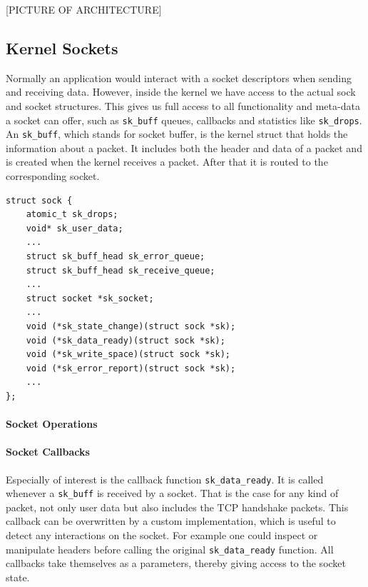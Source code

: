 \documentclass[a4paper,english, 11pt]{report}
\begin{document}
[PICTURE OF ARCHITECTURE]\\

\subsection{Kernel Sockets}
Normally an application would interact with a socket descriptors when sending and receiving data. However, inside the kernel we have access to the actual sock and socket structures. This gives us full access to all functionality and meta-data a socket can offer, such as \verb|sk_buff| queues, callbacks and statistics like \verb|sk_drops|. An \verb|sk_buff|, which stands for socket buffer, is the kernel struct that holds the information about a packet. It includes both the header and data of a packet and is created when the kernel receives a packet. After that it is routed to the corresponding socket.\\

\noindent\begin{minipage}{\linewidth}
\begin{verbatim}
struct sock {
    atomic_t sk_drops;
    void* sk_user_data;
    ...
    struct sk_buff_head	sk_error_queue;
    struct sk_buff_head	sk_receive_queue;
    ...
    struct socket *sk_socket;
    ...
    void (*sk_state_change)(struct sock *sk);
    void (*sk_data_ready)(struct sock *sk);
    void (*sk_write_space)(struct sock *sk);
    void (*sk_error_report)(struct sock *sk);
    ...
};
\end{verbatim}
\label{fig:kern_sock}
\end{minipage}

\paragraph{Socket Operations}

\paragraph{Socket Callbacks}
Especially of interest is the callback function \verb|sk_data_ready|. It is called whenever a \verb|sk_buff| is received by a socket. That is the case for any kind of packet, not only user data but also includes the TCP handshake packets. This callback can be overwritten by a custom implementation, which is useful to detect any interactions on the socket. For example one could inspect or manipulate headers before calling the original \verb|sk_data_ready| function. All callbacks take themselves as a parameters, thereby giving access to the socket state. \\
\end{document}
